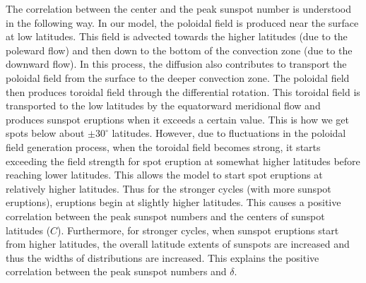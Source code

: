\documentclass[preprint2,times,tighten]{aastex61}
\begin{document}
 The correlation between the center and the peak sunspot number is understood in the following way. In our model, the poloidal field is produced near the surface at low latitudes. This field is advected towards the higher latitudes (due to the poleward flow) and then down to the bottom of the convection zone (due to the downward flow). In this process, the diffusion also contributes to transport the poloidal field from the surface to the deeper convection zone. The poloidal field then produces toroidal field through the differential rotation. This toroidal field is transported to the low latitudes by the equatorward meridional flow and produces sunspot eruptions when it exceeds a certain value. This is how we get spots below about $\pm30^\circ$ latitudes. However, due to fluctuations in the poloidal field generation process, when the toroidal field becomes strong, it starts exceeding the field strength for spot eruption at somewhat higher latitudes before reaching lower latitudes.
This allows the model to start spot eruptions at relatively higher latitudes.
Thus for the stronger cycles (with more sunspot eruptions), eruptions begin at slightly higher latitudes. This causes a positive correlation between the peak sunspot numbers and the centers of sunspot latitudes ($C$). Furthermore, for stronger cycles, when sunspot eruptions start from higher latitudes, the overall latitude extents of sunspots are increased and thus the widths of distributions are increased. This explains the positive correlation between the peak sunspot numbers and $\delta$.
\end{document}
